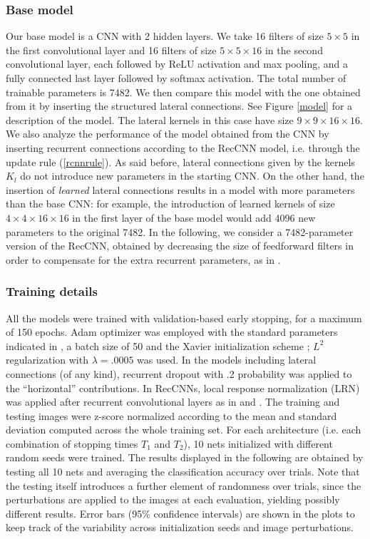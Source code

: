 \documentclass[11pt,oneside,reqno]{amsart}
\begin{document}
 \subsubsection{Base model}
 Our base model is a CNN with 2 hidden layers. We take 16 filters of size $5\times 5$ in the first convolutional layer and 16 filters of size $5\times 5 \times 16$ in the second convolutional layer, each followed by ReLU activation and max pooling, and a fully connected last layer followed by softmax activation. The total number of trainable parameters is 7482. We then compare this model with the one obtained from it by inserting the structured lateral connections. See Figure \ref{model} for a description of the model. The lateral kernels in this case have size $9 \times 9 \times 16 \times 16$. We also analyze the performance of the model obtained from the CNN by inserting recurrent connections according to the RecCNN model, i.e. through the update rule (\ref{rcnnrule}). As said before, lateral connections given by the kernels $K_l$ do not introduce new parameters in the starting CNN. On the other hand, the insertion of \emph{learned} lateral connections results in a model with more parameters than the base CNN: for example, the introduction of learned kernels of size $4\times 4 \times 16 \times 16$ in the first layer of the base model would add 4096 new parameters to the original 7482. In the following, we consider a 7482-parameter version of the RecCNN, obtained by decreasing the size of feedforward filters in order to compensate for the extra recurrent parameters, as in \citet{spoerer}.

 
 \subsubsection{Training details} All the models were trained with validation-based early stopping, for a maximum of 150 epochs. Adam optimizer was employed with the standard parameters indicated in \citet{adam}, a batch size of 50 and the Xavier initialization scheme \citep{xavier}; $L^2$ regularization with $\lambda=.0005$ was used. In the models including lateral connections (of any kind), recurrent dropout \citep{recdrop} with .2 probability was applied to the ``horizontal'' contributions. In RecCNNs, local response normalization (LRN) was applied after recurrent convolutional layers as in \citet{liang} and \citet{spoerer}. The training and testing images were z-score normalized according to the mean and standard deviation computed across the whole training set. For each architecture (i.e. each combination of stopping times $T_1$ and $T_2$), 10 nets initialized with different random seeds were trained. The results displayed in the following are obtained by testing all 10 nets and averaging the classification accuracy over trials. Note that the testing itself introduces a further element of randomness over trials, since the perturbations are applied to the images at each evaluation, yielding possibly different results. Error bars (95\% confidence intervals) are shown in the plots to keep track of the variability across initialization seeds and image perturbations.
 
\end{document}
